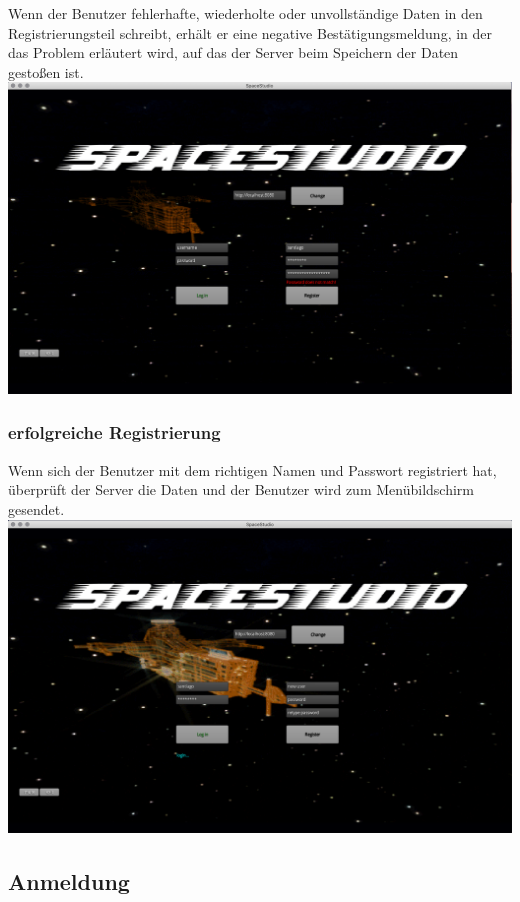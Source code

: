 \documentclass[11pt]{article}
\begin{document}
Wenn der Benutzer fehlerhafte, wiederholte oder unvollständige Daten in den Registrierungsteil schreibt, erhält er eine negative Bestätigungsmeldung, in der das Problem erläutert wird, auf das der Server beim Speichern der Daten gestoßen ist.\\
\includegraphics[scale=0.2]{TestProtocolBilder/doesnotMatchPassword.png}

\subsubsection{erfolgreiche  Registrierung}
Wenn sich der Benutzer mit dem richtigen Namen und Passwort registriert hat, überprüft der Server die Daten und der Benutzer wird zum Menübildschirm gesendet.\\
\includegraphics[scale=0.2]{TestProtocolBilder/erfolgLogin.png}


\subsection{Anmeldung}
\end{document}
